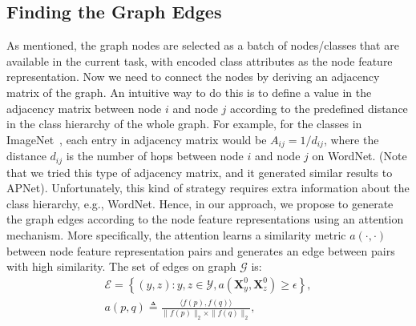 \documentclass[letterpaper]{article} %
\def\vx{{\bm{x}}}
\def\mX{{\bm{X}}}
\begin{document}

\subsection{Finding the Graph Edges}
As mentioned, the graph nodes are selected as a batch of nodes/classes that are available in the current task, with encoded class attributes as the node feature representation. Now we need to connect the nodes by deriving an adjacency matrix of the graph. An intuitive way to do this is to define a value in the adjacency matrix between node $i$ and node $j$ according to the predefined distance in the class hierarchy of the whole graph. For example, for the classes in ImageNet~\cite{imagenet},
each entry in adjacency matrix would be $A_{ij} = 1/d_{ij}$, where the distance $d_{ij}$ is the number of hops between node $i$ and node $j$ on WordNet.
(Note that we tried this type of adjacency matrix, and it generated similar results to APNet). Unfortunately, this kind of strategy requires extra information about the class hierarchy, e.g., WordNet. Hence, in our approach, we propose to generate the graph edges according to the node feature representations using an attention mechanism. More specifically, the attention learns a similarity metric $a(\cdot, \cdot)$ between node feature representation pairs and generates an edge between pairs with high similarity. The set of edges on graph $\mathcal G$ is:
\begin{align}\label{equ:adj-generation}
\mathcal E = \left\{(y,z): y,z\in\mathcal Y, a(\mX_{y}^{0}, \mX_{z}^{0})\geq\epsilon\right\}, \\
a(p, q)\triangleq\frac{\langle f(p), f(q)\rangle}{\|f(p)\|_2 \times \|f(q)\|_2}, \label{equ:attention}
\end{align}
\end{document}
